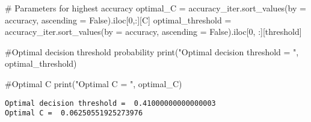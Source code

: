 \documentclass[
  letterpaper,
  DIV=11,
  numbers=noendperiod]{scrreprt}
\newenvironment{Shaded}{\begin{snugshade}}{\end{snugshade}}
\newcommand{\BuiltInTok}[1]{\textcolor[rgb]{0.00,0.23,0.31}{#1}}
\newcommand{\CommentTok}[1]{\textcolor[rgb]{0.37,0.37,0.37}{#1}}
\newcommand{\DecValTok}[1]{\textcolor[rgb]{0.68,0.00,0.00}{#1}}
\newcommand{\NormalTok}[1]{\textcolor[rgb]{0.00,0.23,0.31}{#1}}
\newcommand{\OperatorTok}[1]{\textcolor[rgb]{0.37,0.37,0.37}{#1}}
\newcommand{\StringTok}[1]{\textcolor[rgb]{0.13,0.47,0.30}{#1}}
\newcommand{\VariableTok}[1]{\textcolor[rgb]{0.07,0.07,0.07}{#1}}
\begin{document}
\begin{Shaded}
\begin{Highlighting}[]
\CommentTok{\# Parameters for highest accuracy}
\NormalTok{optimal\_C }\OperatorTok{=}\NormalTok{ accuracy\_iter.sort\_values(by }\OperatorTok{=} \StringTok{\textquotesingle{}accuracy\textquotesingle{}}\NormalTok{, ascending }\OperatorTok{=} \VariableTok{False}\NormalTok{).iloc[}\DecValTok{0}\NormalTok{,:][}\StringTok{\textquotesingle{}C\textquotesingle{}}\NormalTok{]}
\NormalTok{optimal\_threshold }\OperatorTok{=}\NormalTok{ accuracy\_iter.sort\_values(by }\OperatorTok{=} \StringTok{\textquotesingle{}accuracy\textquotesingle{}}\NormalTok{, ascending }\OperatorTok{=} \VariableTok{False}\NormalTok{).iloc[}\DecValTok{0}\NormalTok{, :][}\StringTok{\textquotesingle{}threshold\textquotesingle{}}\NormalTok{]}

\CommentTok{\#Optimal decision threshold probability}
\BuiltInTok{print}\NormalTok{(}\StringTok{"Optimal decision threshold = "}\NormalTok{, optimal\_threshold)}

\CommentTok{\#Optimal C}
\BuiltInTok{print}\NormalTok{(}\StringTok{"Optimal C = "}\NormalTok{, optimal\_C)}
\end{Highlighting}
\end{Shaded}

\begin{verbatim}
Optimal decision threshold =  0.41000000000000003
Optimal C =  0.06250551925273976
\end{verbatim}
\end{document}
